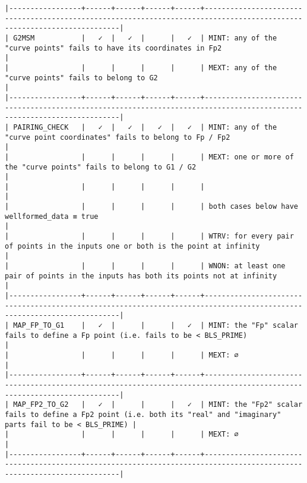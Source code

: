 \documentclass[varwidth=\maxdimen,margin=0.5cm,multi={verbatim}]{standalone}
\begin{document}
\begin{verbatim}
|-----------------+------+------+------+------+------------------------------------------------------------------------------------------------------------------------|
| G2MSM           |   ✓  |   ✓  |      |   ✓  | MINT: any of the "curve points" fails to have its coordinates in Fp2                                                   |
|                 |      |      |      |      | MEXT: any of the "curve points" fails to belong to G2                                                                  |
|-----------------+------+------+------+------+------------------------------------------------------------------------------------------------------------------------|
| PAIRING_CHECK   |   ✓  |   ✓  |   ✓  |   ✓  | MINT: any of the "curve point coordinates" fails to belong to Fp / Fp2                                                 |
|                 |      |      |      |      | MEXT: one or more of the "curve points" fails to belong to G1 / G2                                                     |
|                 |      |      |      |      |                                                                                                                        |
|                 |      |      |      |      | both cases below have wellformed_data ≡ true                                                                           |
|                 |      |      |      |      | WTRV: for every pair of points in the inputs one or both is the point at infinity                                      |
|                 |      |      |      |      | WNON: at least one pair of points in the inputs has both its points not at infinity                                    |
|-----------------+------+------+------+------+------------------------------------------------------------------------------------------------------------------------|
| MAP_FP_TO_G1    |   ✓  |      |      |   ✓  | MINT: the "Fp" scalar fails to define a Fp point (i.e. fails to be < BLS_PRIME)                                        |
|                 |      |      |      |      | MEXT: ∅                                                                                                                |
|-----------------+------+------+------+------+------------------------------------------------------------------------------------------------------------------------|
| MAP_FP2_TO_G2   |   ✓  |      |      |   ✓  | MINT: the "Fp2" scalar fails to define a Fp2 point (i.e. both its "real" and "imaginary" parts fail to be < BLS_PRIME) |
|                 |      |      |      |      | MEXT: ∅                                                                                                                |
|-----------------+------+------+------+------+------------------------------------------------------------------------------------------------------------------------|


\end{verbatim}
\end{document}
